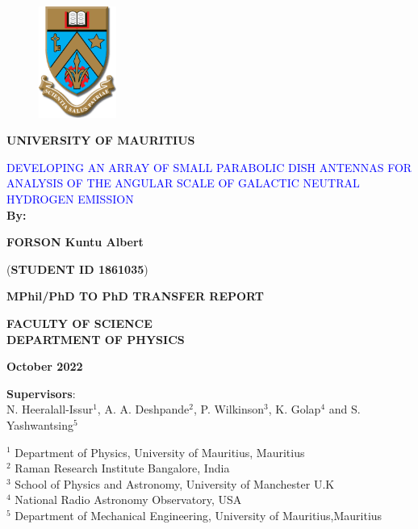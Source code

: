 \documentclass[12pt]{report} %
\begin{document}
  \begin{center}
\begin{figure}
 \centering
\includegraphics[width=1in]{Figures/UoM_LOGO.png}
\end{figure}
        \LARGE{{\textbf{UNIVERSITY OF MAURITIUS\\}}}

\vspace{1cm}

\Large{\textcolor{blue}{{DEVELOPING AN ARRAY OF
SMALL PARABOLIC DISH ANTENNAS FOR ANALYSIS OF THE ANGULAR SCALE OF GALACTIC NEUTRAL HYDROGEN EMISSION}}}
\vspace{1em}\\


	\textbf{By:}
		
        \vspace{1em}
        \Large{ \textbf{FORSON Kuntu  Albert}}
        
        (\normalsize\textbf{STUDENT ID 1861035})\\
        
         \vspace{1em}
         
        \normalsize{\textbf{MPhil/PhD TO PhD TRANSFER REPORT}}\\
        
        \vspace{1em}
       
      \normalsize{\textbf{ FACULTY OF SCIENCE\\
                    DEPARTMENT OF PHYSICS}}
\vspace{2em}

    \normalsize{\textbf{October 2022}}
       
        \vspace{2em}
        
        \normalsize{\textbf{Supervisors}}:\\

	
N. Heeralall-Issur\(^1\),  A. A. Deshpande\(^2\), P. Wilkinson\(^3\), K. Golap\(^4\) and S. Yashwantsing\(^5\)
\vspace{2em}

\(^1\) Department of Physics, University of Mauritius, Mauritius\\
\(^2\) Raman Research Institute Bangalore, India\\
\(^3\) School of Physics and Astronomy, University of Manchester U.K\\
\(^4\) National Radio Astronomy Observatory, USA\\
\(^5\) Department of Mechanical Engineering, University of Mauritius,Mauritius

        \vspace{2em} 
	\end{center}
	
\end{document}
